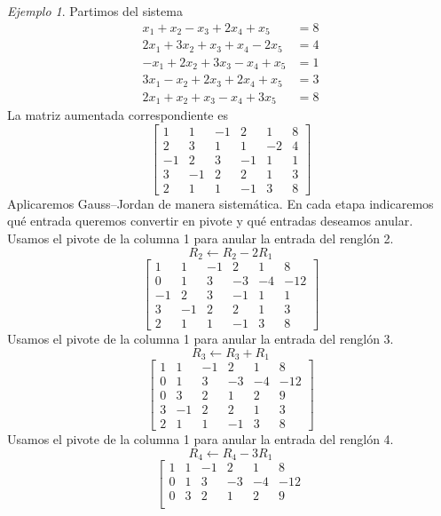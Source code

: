 \documentclass[12pt]{article}
\theoremstyle{remark}
\newtheorem{Ejem}[definicion]{Ejemplo}
\begin{document}
\begin{Ejem}
Partimos del sistema
\[
\begin{aligned}
x_{1} + x_{2} - x_{3} + 2 x_{4} + x_{5} &= 8\\
2 x_{1} + 3 x_{2} + x_{3} + x_{4} - 2 x_{5} &= 4\\
- x_{1} + 2 x_{2} + 3 x_{3} - x_{4} + x_{5} &= 1\\
3 x_{1} - x_{2} + 2 x_{3} + 2 x_{4} + x_{5} &= 3\\
2 x_{1} + x_{2} + x_{3} - x_{4} + 3 x_{5} &= 8
\end{aligned}
\]
La matriz aumentada correspondiente es
\[
\left[\begin{array}{ccccc|c}
1 & 1 & -1 & 2 & 1 & 8\\
2 & 3 & 1 & 1 & -2 & 4\\
-1 & 2 & 3 & -1 & 1 & 1\\
3 & -1 & 2 & 2 & 1 & 3\\
2 & 1 & 1 & -1 & 3 & 8
\end{array}\right]
\]
Aplicaremos Gauss--Jordan de manera sistemática. En cada etapa indicaremos qué entrada queremos convertir en pivote y qué entradas deseamos anular. Usamos el pivote de la columna 1 para anular la entrada del renglón 2.
\[
R_{2}\leftarrow R_{2}-2R_{1}
\]
\[
\left[\begin{array}{ccccc|c}
1 & 1 & -1 & 2 & 1 & 8\\
0 & 1 & 3 & -3 & -4 & -12\\
-1 & 2 & 3 & -1 & 1 & 1\\
3 & -1 & 2 & 2 & 1 & 3\\
2 & 1 & 1 & -1 & 3 & 8
\end{array}\right]
\]
Usamos el pivote de la columna 1 para anular la entrada del renglón 3.
\[
R_{3}\leftarrow R_{3}+R_{1}
\]
\[
\left[\begin{array}{ccccc|c}
1 & 1 & -1 & 2 & 1 & 8\\
0 & 1 & 3 & -3 & -4 & -12\\
0 & 3 & 2 & 1 & 2 & 9\\
3 & -1 & 2 & 2 & 1 & 3\\
2 & 1 & 1 & -1 & 3 & 8
\end{array}\right]
\]
Usamos el pivote de la columna 1 para anular la entrada del renglón 4.
\[
R_{4}\leftarrow R_{4}-3R_{1}
\]
\[
\left[\begin{array}{ccccc|c}
1 & 1 & -1 & 2 & 1 & 8\\
0 & 1 & 3 & -3 & -4 & -12\\
0 & 3 & 2 & 1 & 2 & 9\\

\end{array}\]
\end{Ejem}
\end{document}
